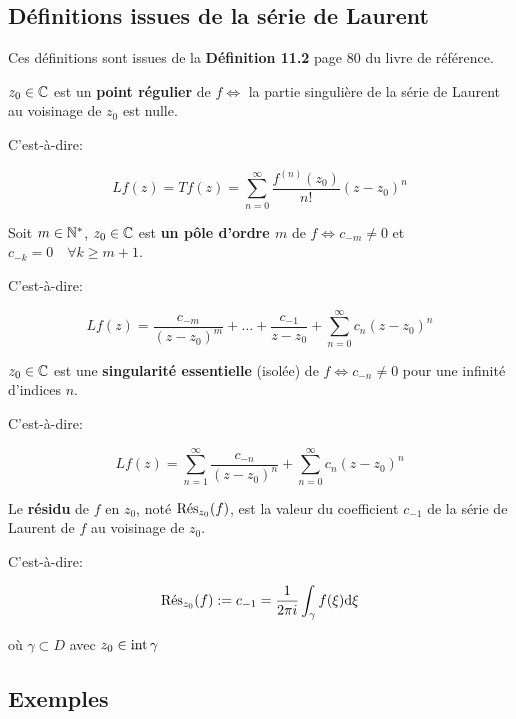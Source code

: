 \subsection{Définitions issues de la série de Laurent}

\begin{note}
    Ces définitions sont issues de la \textbf{Définition 11.2} page 80 du livre de référence.
\end{note}

\begin{definition}[1]
    $z_0 \in \Cx$ est un \textbf{point régulier} de $f \iff$ la partie singulière de la série de Laurent au voisinage de $z_0$ est nulle.
    
    C'est-à-dire:
    
    \[ Lf(z) = Tf(z) = \sum_{n = 0}^{\infty} \frac{f^{(n)}(z_0)}{n!} (z - z_0)^n \]
\end{definition}

\begin{definition}[2]
    Soit $m \in \N^\ast$, $z_0 \in \Cx$ est \textbf{un pôle d'ordre $m$} de $f \iff c_{-m} \neq 0$ et $c_{-k} = 0 \quad \forall k \geq m + 1$.
    
    C'est-à-dire:
    
    \[ Lf(z) = \frac{c_{-m}}{(z-z_0)^m} + \ldots + \frac{c_{-1}}{z-z_0} + \sum_{n = 0}^{\infty} c_n(z - z_0)^n \]
\end{definition}

\begin{definition}[3]
    $z_0 \in \Cx$ est une \textbf{singularité essentielle} (isolée) de $f \iff c_{-n} \neq 0$ pour une infinité d'indices $n$.
    
    C'est-à-dire:
    
    \[ Lf(z) = \sum_{n = 1}^{\infty} \frac{c_{-n}}{(z - z_0)^{n}} + \sum_{n = 0}^{\infty} c_n(z - z_0)^n \]
\end{definition}

\begin{definition}[4]
    Le \textbf{résidu} de $f$ en $z_0$, noté $\Res_{z_0}(f)$, est la valeur du coefficient $c_{-1}$ de la série de Laurent de $f$ au voisinage de $z_0$.
    
    C'est-à-dire:
    
    \[ \Res_{z_0}(f) := c_{-1} = \oipi \int_\gamma f(\xi) \dxi \]
    
    où $\gamma \subset D$ avec $z_0 \in \inte \gamma$
\end{definition}

\subsection{Exemples}

